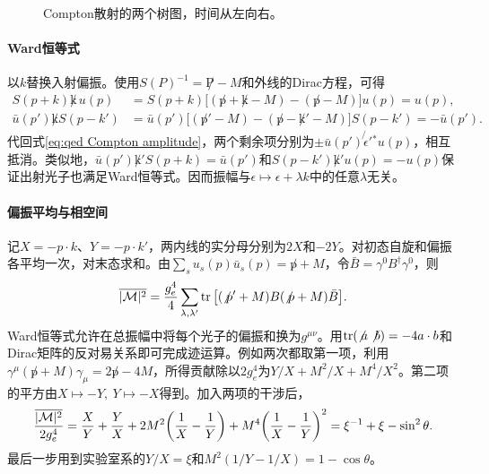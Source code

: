 \begin{figure}[htbp]
    \centering
    \caption{Compton散射的两个树图，时间从左向右。}
    \label{fig:compton-tree-graphs}
\end{figure}

\paragraph{Ward恒等式}
以$k$替换入射偏振。使用$S(P)^{-1} = \not P - M$和外线的Dirac方程，可得
\begin{align*}
    S(p + k)\not k\,u(p)
      &= S(p + k)\big[(\not p + \not k - M) - (\not p - M)\big]u(p) = u(p),\\
    \bar u(p')\not k S(p - k')
      &= \bar u(p')\big[(\not p' - M) - (\not p - \not k' - M)\big]S(p - k') = -\bar u(p').
\end{align*}
代回式\eqref{eq:qed Compton amplitude}，两个剩余项分别为$\pm\bar u(p')\not{\epsilon}'{}^*u(p)$，相互抵消。类似地，$\bar u(p')\not k' S(p + k) = \bar u(p')$和$S(p - k')\not k' u(p) = -u(p)$保证出射光子也满足Ward恒等式。因而振幅与$\epsilon \mapsto \epsilon + \lambda k$中的任意$\lambda$无关。

\paragraph{偏振平均与相空间}
记$X = -p \cdot k$、$Y = -p \cdot k'$，两内线的实分母分别为$2X$和$-2Y$。对初态自旋和偏振各平均一次，对末态求和。由$\textstyle \sum_s u_s(p)\bar u_s(p) = \not p + M$，令$\bar B = \gamma^0B^\dagger\gamma^0$，则
\[
    \overline{\lvert\mathcal M\rvert^2} = \frac{g_e^4}{4}
    \sum_{\lambda,\lambda'}\operatorname{tr}\big[(\not p' + M)B(\not p + M)\bar B\big].
\]
Ward恒等式允许在总振幅中将每个光子的偏振和换为$g^{\mu\nu}$。用$\operatorname{tr}(\not a\not b) = -4a \cdot b$和Dirac矩阵的反对易关系即可完成迹运算。例如两次都取第一项，利用$\gamma^\mu(\not p + M)\gamma_\mu = 2\not p - 4M$，所得贡献除以$2g_e^4$为$Y/X + M^2/X + M^4/X^2$。第二项的平方由$X \mapsto -Y,\ Y \mapsto -X$得到。加入两项的干涉后，
\[
    \frac{\overline{\lvert\mathcal M\rvert^2}}{2g_e^4}
    = \frac{X}{Y} + \frac{Y}{X} + 2M^2\bigg(\frac1X - \frac1Y\bigg)
      + M^4\bigg(\frac1X - \frac1Y\bigg)^2
    = \xi^{-1} + \xi - \sin^2\theta .
\]
最后一步用到实验室系的$Y/X = \xi$和$M^2(1/Y - 1/X) = 1 - \cos\theta$。

